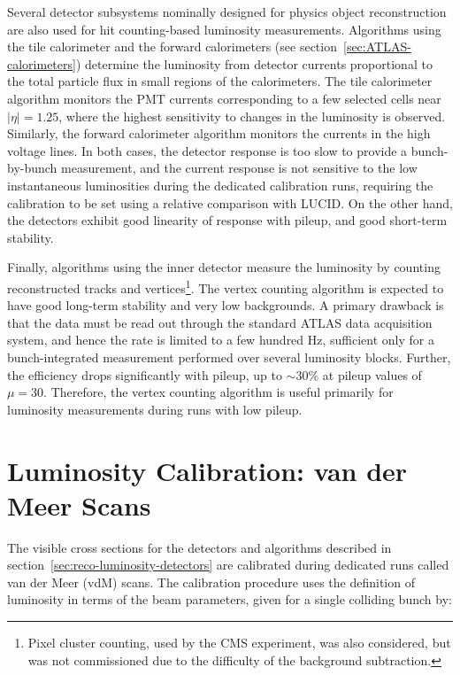 Several detector subsystems nominally designed for physics object reconstruction are also used for hit counting-based luminosity measurements. Algorithms using the tile calorimeter and the forward calorimeters (see section~\ref{sec:ATLAS-calorimeters}) determine the luminosity from detector currents proportional to the total particle flux in small regions of the calorimeters. The tile calorimeter algorithm monitors the PMT currents corresponding to a few selected cells near $|\eta|=1.25$, where the highest sensitivity to changes in the luminosity is observed. Similarly, the forward calorimeter algorithm monitors the currents in the high voltage lines. In both cases, the detector response is too slow to provide a bunch-by-bunch measurement, and the current response is not sensitive to the low instantaneous luminosities during the dedicated calibration runs, requiring the calibration to be set using a relative comparison with LUCID. On the other hand, the detectors exhibit good linearity of response with pileup, and good short-term stability. 

Finally, algorithms using the inner detector measure the luminosity by counting reconstructed tracks and vertices\footnote{Pixel cluster counting, used by the CMS experiment, was also considered, but was not commissioned due to the difficulty of the background subtraction.}. The vertex counting algorithm is expected to have good long-term stability and very low backgrounds. A primary drawback is that the data must be read out through the standard ATLAS data acquisition system, and hence the rate is limited to a few hundred Hz, sufficient only for a bunch-integrated measurement performed over several luminosity blocks. Further, the efficiency drops significantly with pileup, up to $\sim30\%$ at pileup values of $\mu=30$. Therefore, the vertex counting algorithm is useful primarily for luminosity measurements during runs with low pileup. 


\section{Luminosity Calibration: van der Meer Scans}\label{sec:reco-luminosity-calibration}
The visible cross sections for the detectors and algorithms described in section~\ref{sec:reco-luminosity-detectors} are calibrated during dedicated runs called van der Meer (vdM) scans. The calibration procedure uses the definition of luminosity in terms of the beam parameters, given for a single colliding bunch by:

